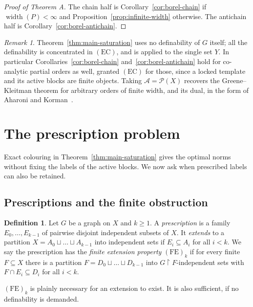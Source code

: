 \documentclass[11pt,reqno]{amsart}
\theoremstyle{plain}
\theoremstyle{definition}
\newtheorem{definition}[theorem]{Definition}
\theoremstyle{remark}
\newtheorem{remark}[theorem]{Remark}
\newcommand{\restr}{\mathbin{\upharpoonright}}
\newcommand{\wdt}{\operatorname{width}}
\begin{document}
\begin{proof}[Proof of Theorem A]
The chain half is Corollary~\ref{cor:borel-chain} if $\wdt(P)<\infty$ and
Proposition~\ref{prop:infinite-width} otherwise. The antichain half is
Corollary~\ref{cor:borel-antichain}.
\end{proof}

\begin{remark}
Theorem~\ref{thm:main-saturation} uses no definability of $G$ itself; all the
definability is concentrated in $\mathrm{(EC)}$, and is applied to the single
set $Y$. In particular Corollaries~\ref{cor:borel-chain}
and~\ref{cor:borel-antichain} hold for co-analytic partial orders as well,
granted $\mathrm{(EC)}$ for those, since a locked template and its active
blocks are finite objects. Taking $\mathcal A=\mathcal P(X)$ recovers the
Greene--Kleitman theorem for arbitrary orders of finite width, and its dual,
in the form of Aharoni and Korman~\cite{AharoniKorman1992}.
\end{remark}

\section{The prescription problem}
\label{sec:prescription}

Exact colouring in Theorem~\ref{thm:main-saturation} gives the optimal
norms without fixing the labels of the active blocks. We now ask when
prescribed labels can also be retained.

\subsection{Prescriptions and the finite obstruction}
\label{subsec:prescription}

\begin{definition}
\label{def:prescription}
Let $G$ be a graph on $X$ and $k\ge1$. A \emph{prescription} is a family
$E_0,\dots,E_{k-1}$ of pairwise disjoint independent subsets of $X$. It
\emph{extends} to a partition $X=A_0\sqcup\dots\sqcup A_{k-1}$ into
independent sets if $E_i\subseteq A_i$ for all $i<k$. We say the prescription
has the \emph{finite extension property} $\mathrm{(FE)}_k$ if for every finite
$F\subseteq X$ there is a partition $F=D_0\sqcup\dots\sqcup D_{k-1}$ into
$G\restr F$-independent sets with $F\cap E_i\subseteq D_i$ for all $i<k$.
\end{definition}

$\mathrm{(FE)}_k$ is plainly necessary for an extension to exist. It is also
sufficient, if no definability is demanded.
\end{document}
